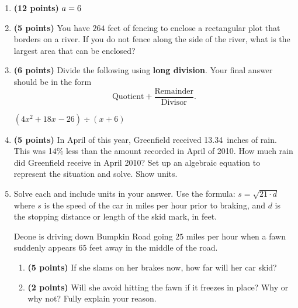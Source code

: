 \documentclass[12pt]{amsart}
\begin{document}
\begin{enumerate}
\item {\bf (12 points)} 
 $a = \a$ 
\vfill 
\newpage\def \x{66}\def \y{132}\def \L{264}\def \area{8712}
\item {\bf (5 points)} 
 You have $\L$ feet of fencing to enclose a rectangular plot that borders on a river. If you do not fence along the side of the river, what is the largest area that can be enclosed? \\

  
\vfill \vfill \vfill
\def \a{6}\def \b{4}\def \c{-6}\def \r{10}\def \monicpol{x^{}+6}\def \longnbad{4x^{2}+18x^{}-26}\def \anspol{4x^{}-6}
\item {\bf (6 points)} 
 Divide the following using {\bf long division}. Your final answer should be in the form $$ \text{Quotient} + \dfrac{\text{Remainder}}{\text{Divisor}}.$$

\vspace{3mm}

$(\longnbad) \div (\monicpol)$

\vfill  \vfill \vfill
\newpage\def \discount{14}\def \paid{1264.52}\def \rainy{13.34}\def \orcost{1470.37}\def \purcost{1109.23}\def \orrainy{15.51}
\item {\bf (5 points)} 
 In April of this year, Greenfield received \rainy\ inches of rain. This was \discount\% less than the amount recorded in April of 2010. How much rain did Greenfield  receive in April 2010? Set up an algebraic equation to represent the situation and solve. Show units.

\vfill 
\def \insvar{21}\def \d{65}\def \zerospeed{36.95}\def \slimit{25}\def \s{43}\def \skidd{88.048}\def \safed{29.762}\def \rsafed{29}

 
\item Solve each and include units in your answer. Use the formula: $s = \sqrt{\insvar \cdot d}$ where $s$ is the speed of the car in miles per hour prior to braking, and $d$ is the stopping distance or length of the skid mark, in feet. 

\vspace{3mm}

Deone is driving down Bumpkin Road going $\slimit$ miles per hour when a fawn suddenly appears $\d$ feet away in the middle of the road. \begin{enumerate}
\item {\bf (5 points)} If she slams on her brakes now, how far will her car skid? \vspace{4cm}
\item {\bf (2 points)} Will she avoid hitting the fawn if it freezes in place? Why or why not? Fully explain your reason. \vspace{3cm}
\end{enumerate}



\end{enumerate}
\end{document}
